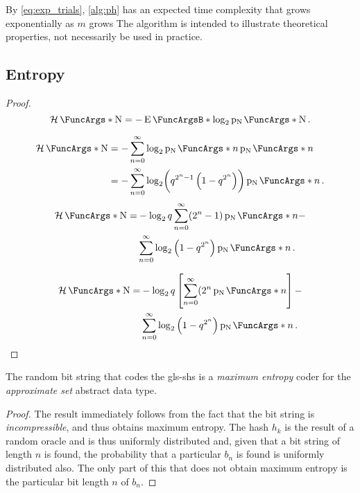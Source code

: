 \documentclass[ ../main.tex]{subfiles}
\begin{document}
By \cref{eq:exp_trials}, \cref{alg:ph} has an expected time complexity that grows exponentially as $m$ grows The algorithm is intended to illustrate theoretical properties, not necessarily be used in practice.

\subsection{Entropy}

\begin{proof}
\begin{equation}
    \Entropy{\RV{N}} = -\Expect{\log_2 \PDF{\RV{N}}[\RV{N}]}\,.
\end{equation}

\begin{align}
    \Entropy{\RV{N}}
        &= -\sum_{n=0}^{\infty} \log_2 \PDF{n}[\RV{N}] \PDF{n}[\RV{N}]\\
        &= -\sum_{n=0}^{\infty} \log_2\! \left(q^{2^n-1}\left(1-q^{2^n}\right)\right) \PDF{n}[\RV{N}]\,.
\end{align}
\begin{equation}
\begin{split}
    \Entropy{\RV{N}}
        =&-\log_2 q \sum_{n=0}^{\infty}
            (2^n-1) \PDF{n}[\RV{N}] -\\
         &\sum_{n=0}^{\infty} \log_2\left(1-q^{2^n}\right) \PDF{n}[\RV{N}]\,.
\end{split}
\end{equation}


\begin{equation}
\begin{split}
    \Entropy{\RV{N}}
        =&-\log_2 q \left[\sum_{n=0}^{\infty}
            (2^n \PDF{n}[\RV{N}]\right] -\\
         &\sum_{n=0}^{\infty} \log_2\left(1-q^{2^n}\right) \PDF{n}[\RV{N}]\,.
\end{split}
\end{equation}

\end{proof}


\begin{theorem}
The random bit string that codes the \gls{gls-shs} is a \emph{maximum entropy} coder for the \emph{approximate set} abstract data type.
\end{theorem}
\begin{proof}
The result immediately follows from the fact that the bit string is \emph{incompressible}, and thus obtains maximum entropy. The hash $h_k$ is the result of a random oracle and is thus uniformly distributed and, given that a bit string of length $n$ is found, the probability that a particular $b_n$ is found is uniformly distributed also. The only part of this that does not obtain maximum entropy is the particular bit length $n$ of $b_n$.
\end{proof}
\end{document}
